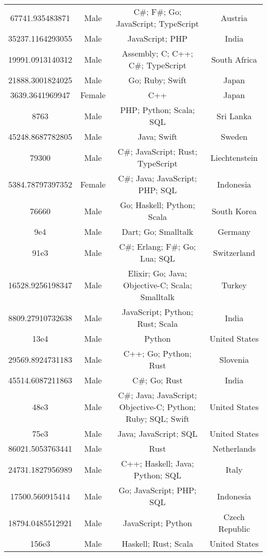 \begin{center}
\begin{tabular}{ |c|c|c|c| }
67741.935483871  &  Male  &  C\#; F\#; Go; JavaScript; TypeScript  &  Austria  \\ 
35237.1164293055  &  Male  &  JavaScript; PHP  &  India  \\ 
19991.0913140312  &  Male  &  Assembly; C; C++; C\#; TypeScript  &  South Africa  \\ 
21888.3001824025  &  Male  &  Go; Ruby; Swift  &  Japan  \\ 
3639.3641969947  &  Female  &  C++  &  Japan  \\ 
8763  &  Male  &  PHP; Python; Scala; SQL  &  Sri Lanka  \\ 
45248.8687782805  &  Male  &  Java; Swift  &  Sweden  \\ 
79300  &  Male  &  C\#; JavaScript; Rust; TypeScript  &  Liechtenstein  \\ 
5384.78797397352  &  Female  &  C\#; Java; JavaScript; PHP; SQL  &  Indonesia  \\ 
76660  &  Male  &  Go; Haskell; Python; Scala  &  South Korea  \\ 
9e4  &  Male  &  Dart; Go; Smalltalk  &  Germany  \\ 
91e3  &  Male  &  C\#; Erlang; F\#; Go; Lua; SQL  &  Switzerland  \\ 
16528.9256198347  &  Male  &  Elixir; Go; Java; Objective-C; Scala; Smalltalk  &  Turkey  \\ 
8809.27910732638  &  Male  &  JavaScript; Python; Rust; Scala  &  India  \\ 
13e4  &  Male  &  Python  &  United States  \\ 
29569.8924731183  &  Male  &  C++; Go; Python; Rust  &  Slovenia  \\ 
45514.6087211863  &  Male  &  C\#; Go; Rust  &  India  \\ 
48e3  &  Male  &  C\#; Java; JavaScript; Objective-C; Python; Ruby; SQL; Swift  &  United States  \\ 
75e3  &  Male  &  Java; JavaScript; SQL  &  United States  \\ 
86021.5053763441  &  Male  &  Rust  &  Netherlands  \\ 
24731.1827956989  &  Male  &  C++; Haskell; Java; Python; SQL  &  Italy  \\ 
17500.560915414  &  Male  &  Go; JavaScript; PHP; SQL  &  Indonesia  \\ 
18794.0485512921  &  Male  &  JavaScript; Python  &  Czech Republic  \\ 
156e3  &  Male  &  Haskell; Rust; Scala  &  United States  \\ 

\end{tabular}
\end{center}

